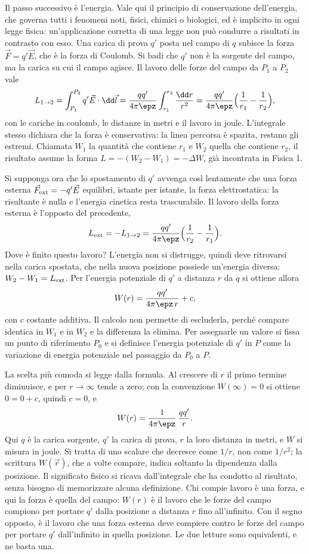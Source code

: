 \documentclass[main.tex]{subfiles}
\begin{document}
	Il passo successivo è l'energia. Vale qui il principio di conservazione dell'energia, che governa tutti i fenomeni noti, fisici, chimici o biologici, ed è implicito in ogni legge fisica: un'applicazione corretta di una legge non può condurre a risultati in contrasto con esso. Una carica di prova $q'$ posta nel campo di $q$ subisce la forza $\vec F=q'\vec E$, che è la forza di Coulomb. Si badi che $q'$ non è la sorgente del campo, ma la carica su cui il campo agisce. Il lavoro delle forze del campo da $P_1$ a $P_2$ vale
	\[
	L_{1\to2}=\int_{P_1}^{P_2} q'\vec E\cdot\dd\vec l=\frac{qq'}{4\pi\epz}\int_{r_1}^{r_2}\frac{\dd r}{r^2}=\frac{qq'}{4\pi\epz}\Big(\frac1{r_1}-\frac1{r_2}\Big),
	\]
	con le cariche in coulomb, le distanze in metri e il lavoro in joule. L'integrale stesso dichiara che la forza è conservativa: la linea percorsa è sparita, restano gli estremi. Chiamata $W_1$ la quantità che contiene $r_1$ e $W_2$ quella che contiene $r_2$, il risultato assume la forma $L=-(W_2-W_1)=-\Delta W$, già incontrata in Fisica 1.
	
	Si supponga ora che lo spostamento di $q'$ avvenga così lentamente che una forza esterna $\vec F_{\rm ext}=-q'\vec E$ equilibri, istante per istante, la forza elettrostatica: la risultante è nulla e l'energia cinetica resta trascurabile. Il lavoro della forza esterna è l'opposto del precedente,
	\[
	L_{\rm ext}=-L_{1\to2}=\frac{qq'}{4\pi\epz}\Big(\frac1{r_2}-\frac1{r_1}\Big).
	\]
	Dove è finito questo lavoro? L'energia non si distrugge, quindi deve ritrovarsi nella carica spostata, che nella nuova posizione possiede un'energia diversa: $W_2-W_1=L_{\rm ext}$. Per l'energia potenziale di $q'$ a distanza $r$ da $q$ si ottiene allora
	\[
	W(r)=\frac{qq'}{4\pi\epz\,r}+c ,
	\]
	con $c$ costante additiva. Il calcolo non permette di escluderla, perché compare identica in $W_1$ e in $W_2$ e la differenza la elimina. Per assegnarle un valore si fissa un punto di riferimento $P_0$ e si definisce l'energia potenziale di $q'$ in $P$ come la variazione di energia potenziale nel passaggio da $P_0$ a $P$.
	
	La scelta più comoda si legge dalla formula. Al crescere di $r$ il primo termine diminuisce, e per $r\to\infty$ tende a zero; con la convenzione $W(\infty)=0$ si ottiene $0=0+c$, quindi $c=0$, e
	\[
	W(r)=\frac{1}{4\pi\epz}\,\frac{qq'}{r}.
	\]
	Qui $q$ è la carica sorgente, $q'$ la carica di prova, $r$ la loro distanza in metri, e $W$ si misura in joule. Si tratta di uno scalare che decresce come $1/r$, non come $1/r^2$; la scrittura $W(\vec r)$, che a volte compare, indica soltanto la dipendenza dalla posizione. Il significato fisico si ricava dall'integrale che ha condotto al risultato, senza bisogno di memorizzare alcuna definizione. Chi compie lavoro è una forza, e qui la forza è quella del campo: $W(r)$ è il lavoro che le forze del campo compiono per portare $q'$ dalla posizione a distanza $r$ fino all'infinito. Con il segno opposto, è il lavoro che una forza esterna deve compiere contro le forze del campo per portare $q'$ dall'infinito in quella posizione. Le due letture sono equivalenti, e ne basta una.
	
\end{document}
